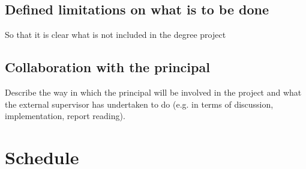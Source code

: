 \documentclass[12pt]{article}
\begin{document}
\subsection*{Defined limitations on what is to be done}
So that it is clear what is not included in the degree project

\subsection*{Collaboration with the principal} Describe the way in which the principal will be involved in the project and what the external supervisor has undertaken to do (e.g. in terms of discussion, implementation, report reading).

\newpage
\section*{Schedule}

\end{document}
